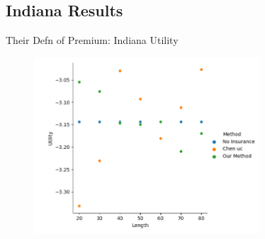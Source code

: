 \documentclass{beamer}
\begin{document}
\subsection*{Indiana Results}
\begin{frame}{Their Defn of Premium: Indiana Utility}
    \begin{figure}
        \includegraphics[width=0.75\textwidth]{../../../output/figures/Chen Premium/Indiana_Utility_Length_ml1241.png}
    \end{figure}
\end{frame}



        
\end{document}
